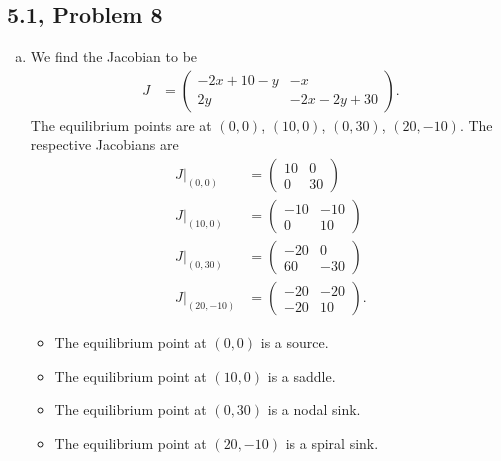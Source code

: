 \documentclass[10pt]{mypackage}
\begin{document}
\subsection{5.1, Problem 8}%
\begin{enumerate}[(a)]
  \item We find the Jacobian to be
    \begin{align*}
      J &= \begin{pmatrix}-2x + 10 - y & -x \\ 2y & -2x - 2y + 30\end{pmatrix}.
    \end{align*}
    The equilibrium points are at $\left(0,0\right)$, $\left(10,0\right)$, $\left(0,30\right)$, $\left(20,-10\right)$. The respective Jacobians are
    \begin{align*}
      J|_{(0,0)} &= \begin{pmatrix}10 & 0 \\ 0 & 30\end{pmatrix}\\
      J|_{(10,0)} &= \begin{pmatrix}-10 & -10 \\ 0 & 10\end{pmatrix}\\
      J|_{(0,30)} &= \begin{pmatrix}-20 & 0 \\ 60 & -30\end{pmatrix}\\
      J|_{(20,-10)} &= \begin{pmatrix}-20 & -20 \\ -20 & 10\end{pmatrix}.
    \end{align*}
    \begin{itemize}
      \item The equilibrium point at $\left(0,0\right)$ is a source.
      \item The equilibrium point at $\left(10,0\right)$ is a saddle.
      \item The equilibrium point at $\left(0,30\right)$ is a nodal sink.
      \item The equilibrium point at $\left(20,-10\right)$ is a spiral sink.
    \end{itemize}
\end{enumerate}
\end{document}
